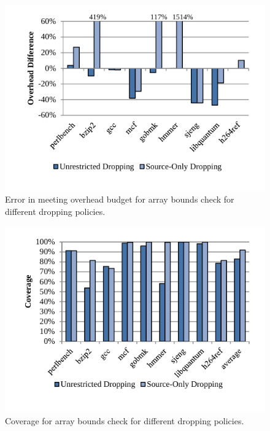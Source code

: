 \begin{figure}
  \begin{center}
    \includegraphics[width=\columnwidth]{figs/data_bc_exec_time.pdf}
    \vspace{-0.2in}
    \caption{Error in meeting overhead budget for array bounds check for different dropping policies.}
    \label{fig:evaluation.bc_exec_time}
    \vspace{-0.2in}
  \end{center}
\end{figure}

\begin{figure}
  \begin{center}
    \includegraphics[width=\columnwidth]{figs/data_bc_coverage.pdf}
    \vspace{-0.2in}
    \caption{Coverage for array bounds check for different dropping policies.}
    \label{fig:evaluation.bc_coverage}
    \vspace{-0.2in}
  \end{center}
\end{figure}

